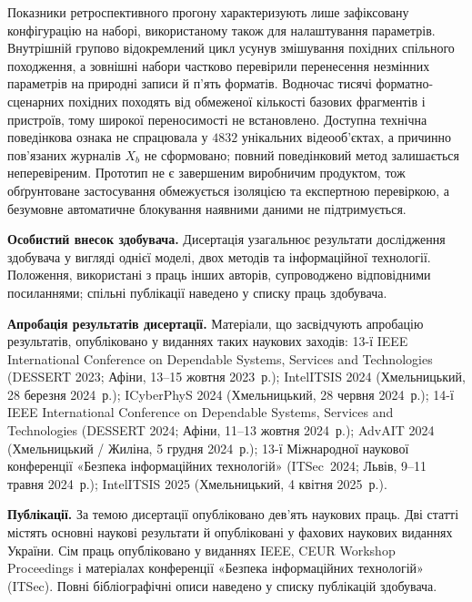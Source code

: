 Показники ретроспективного прогону характеризують лише зафіксовану конфігурацію на наборі, використаному також для налаштування параметрів. Внутрішній групово відокремлений цикл усунув змішування похідних спільного походження, а зовнішні набори частково перевірили перенесення незмінних параметрів на природні записи й п’ять форматів. Водночас тисячі форматно-сценарних похідних походять від обмеженої кількості базових фрагментів і пристроїв, тому широкої переносимості не встановлено. Доступна технічна поведінкова ознака не спрацювала у $4832$ унікальних відеооб’єктах, а причинно пов’язаних журналів $X_b$ не сформовано; повний поведінковий метод залишається неперевіреним. Прототип не є завершеним виробничим продуктом, тож обґрунтоване застосування обмежується ізоляцією та експертною перевіркою, а безумовне автоматичне блокування наявними даними не підтримується.

\textbf{Особистий внесок здобувача.}
Дисертація узагальнює результати дослідження здобувача у вигляді однієї моделі, двох методів та інформаційної технології. Положення, використані з праць інших авторів, супроводжено відповідними посиланнями; спільні публікації наведено у списку праць здобувача.

\textbf{Апробація результатів дисертації.}
Матеріали, що засвідчують апробацію результатів, опубліковано у виданнях таких наукових заходів: 13-ї IEEE International Conference on Dependable Systems, Services and Technologies (DESSERT 2023; Афіни, 13--15 жовтня 2023~р.); IntelITSIS 2024 (Хмельницький, 28 березня 2024~р.); ICyberPhyS 2024 (Хмельницький, 28 червня 2024~р.); 14-ї IEEE International Conference on Dependable Systems, Services and Technologies (DESSERT 2024; Афіни, 11--13 жовтня 2024~р.); AdvAIT 2024 (Хмельницький / Жиліна, 5 грудня 2024~р.); 13-ї Міжнародної наукової конференції «Безпека інформаційних технологій» (ITSec~2024; Львів, 9--11 травня 2024~р.); IntelITSIS 2025 (Хмельницький, 4 квітня 2025~р.).

\textbf{Публікації.}
За темою дисертації опубліковано дев’ять наукових праць. Дві статті містять основні наукові результати й опубліковані у фахових наукових виданнях України. Сім праць опубліковано у виданнях IEEE, CEUR Workshop Proceedings і матеріалах конференції «Безпека інформаційних технологій» (ITSec). Повні бібліографічні описи наведено у списку публікацій здобувача.

